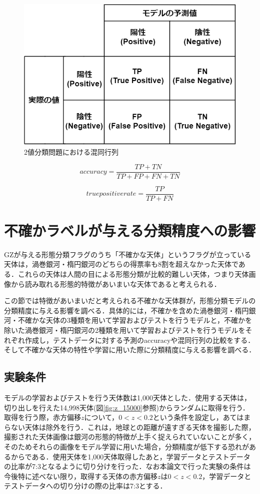 \documentclass[a4j, 11pt]{jreport}
\begin{document}
\begin{figure}[H]
 \centering
 \includegraphics[width=12cm]{images/cm.png}
 \caption{2値分類問題における混同行列}
 \label{fig:cm}
\end{figure}

\begin{equation}
 accuracy = \frac{TP + TN}{TP + FP + FN + TN}
 \label{equ:accuracy}
\end{equation}

\begin{equation}
 true positive rate = \frac{TP}{TP + FN}
 \label{}
\end{equation}

\section{不確かラベルが与える分類精度への影響}
GZが与える形態分類フラグのうち「不確かな天体」というフラグが立っている天体は，渦巻銀河・楕円銀河のどちらの得票率も8割を超えなかった天体である．これらの天体は人間の目による形態分類が比較的難しい天体，つまり天体画像から読み取れる形態的特徴があいまいな天体であると考えられる．

この節では特徴があいまいだと考えられる不確かな天体群が，形態分類モデルの分類精度に与える影響を調べる．具体的には，不確かを含めた渦巻銀河・楕円銀河・不確かな天体の3種類を用いて学習およびテストを行うモデルと，不確かを除いた渦巻銀河・楕円銀河の2種類を用いて学習およびテストを行うモデルをそれぞれ作成し，テストデータに対する予測のaccuracyや混同行列の比較をする．そして不確かな天体の特性や学習に用いた際に分類精度に与える影響を調べる．

\subsection{実験条件}
モデルの学習およびテストを行う天体数は1,000天体とした．使用する天体は，切り出しを行えた14,998天体(図\ref{fig:z_15000}参照)からランダムに取得を行う．取得を行う際，赤方偏移$z$について，$0 < z < 0.2$という条件を設定し，あてはまらない天体は除外を行う．これは，地球との距離が遠すぎる天体を撮影した際，撮影された天体画像は銀河の形態的特徴が上手く捉えられていないことが多く，そのためそれらの画像をモデル学習に用いた場合，分類精度が低下する恐れがあるからである．使用天体を1,000天体取得したあと，学習データとテストデータの比率が7:3となるように切り分けを行った．なお本論文で行った実験の条件は今後特に述べない限り，取得する天体の赤方偏移$z$は$0 < z < 0.2$，学習データとテストデータへの切り分けの際の比率は7:3とする．
\end{document}
